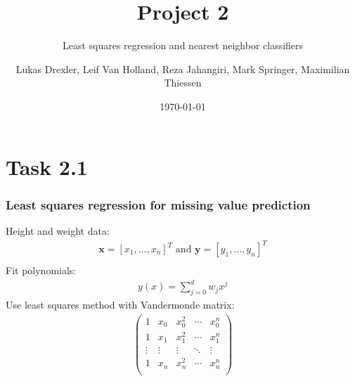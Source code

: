 \documentclass{beamer}
\title[Project 1]{Project 2}
\subtitle{Least squares regression and nearest neighbor classifiers}
\author{Lukas Drexler, Leif Van Holland, Reza Jahangiri, Mark Springer, Maximilian Thiessen}
\institute[Universität Bonn]{Rheinische Friedrich-Wilhelms-Universität}
\date{\today}
\begin{document}
	
\begin{frame}%
	\titlepage
\end{frame}



\section{Task 2.1}

\begin{frame}
\frametitle{Least squares regression for missing value prediction}
Height and weight data:
\begin{align*}
	\mathbf{x} = [x_1,...,x_n]^T \text{ and } \mathbf{y} = [y_1,...,y_n]^T\\
\end{align*}
Fit polynomials:
\begin{align*}
	y(x) = \sum_{j=0}^{d}w_jx^j
\end{align*}
Use least squares method with Vandermonde matrix:
\begin{align*}
\begin{pmatrix}
1 & x_0 & x_0^2 & \cdots & x_0^n \\ 
1 & x_1 & x_1^2 & \cdots & x_1^n \\
\vdots & \vdots & \vdots & \ddots &\vdots \\
1 & x_n & x_n^2 & \cdots & x_n^n \\ 
\end{pmatrix}\\
\end{align*}
\end{frame}
\end{document}

